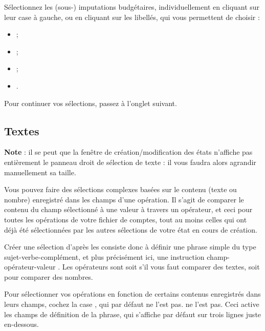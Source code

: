 Sélectionnez les (sous-) imputations budgétaires, individuellement en cliquant sur leur case à gauche, ou en cliquant sur les libellés, qui vous permettent de choisir :

\begin{itemize}
	\item {} ;
	\item {} ;
	\item {} ;
	\item {}.
\end{itemize}

Pour continuer vos sélections, passez à l'onglet suivant.


\subsection{Textes\label{reportscreation-selection-text}}

\textbf{Note} : il se peut que la fenêtre de création/modification des états n'affiche  pas entièrement le panneau droit de sélection de texte : il vous faudra alors agrandir manuellement sa taille.

Vous pouvez faire des sélections complexes basées sur le contenu (texte ou nombre) enregistré dans les champs d'une opération. Il s'agit de comparer le contenu du champ sélectionné à une valeur à travers un opérateur, et ceci pour toutes les opérations de votre fichier de comptes, tout au moins celles qui ont déjà été sélectionnées par les autres sélections de votre état en cours de création.

Créer une sélection d'après les  consiste donc à définir une  phrase simple du type sujet-verbe-complément, et plus précisément ici, une instruction \og champ-opérateur-valeur \fg{}. Les opérateurs sont soit  s'il vous faut comparer des textes, soit  pour comparer des nombres. 

Pour sélectionner vos opérations en fonction de certains contenus enregistrés dans leurs champs, cochez la case , qui par défaut \ifIllustration ne l'est pas.
\else ne l'est pas. \fi Ceci active les champs de définition de la phrase, qui s'affiche par défaut sur trois lignes juste en-dessous.

